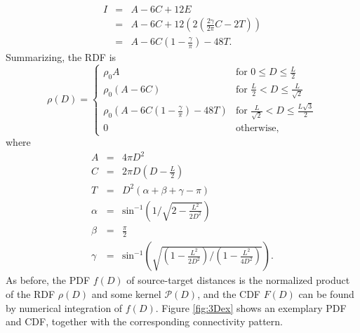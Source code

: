 \begin{eqnarray}
I &=& A - 6C + 12E \\
  &=& A - 6C + 12\left( 2\left( \tfrac{2\gamma}{2\pi}C - 2T \right) \right) \\
  &=& A - 6C\left( 1 - \tfrac{\gamma}{\pi} \right) - 48T.
\end{eqnarray}
Summarizing, the RDF is
\begin{equation}
\rho(D) = 
\begin{cases}
   \rho_0 A   &   \text{for } 0 \le D \le \frac{L}{2} \\ 
   \rho_0 \left(A - 6C\right)   &   \text{for } \frac{L}{2} < D \le \frac{L}{\sqrt{2}} \\
   \rho_0 \left(A - 6C\left( 1 - \tfrac{\gamma}{\pi} \right) - 48T \right)   &   \text{for } \frac{L}{\sqrt{2}} < D \le \frac{L\sqrt{3}}{2} \\
   0 & \text{otherwise},
\end{cases}
\end{equation}
where
\begin{eqnarray}
A &=& 4\pi D^2 \\
C &=& 2\pi D \left(D-\tfrac{L}{2}\right) \\
T &=& D^2\left( \alpha+\beta+\gamma-\pi \right) \\
\alpha &=& \text{sin}^{-1}\left( 1 / \sqrt{2 - \tfrac{L^2}{2D^2}} \right) \\
\beta  &=& \tfrac{\pi}{2} \\
\gamma &=& \text{sin}^{-1}\left(  \sqrt{(1 - \tfrac{L^2}{2D^2}) / (1 - \tfrac{L^2}{4D^2})}  \right) .
\end{eqnarray}
As before, the PDF $f(D)$ of source-target distances is the normalized product of the RDF $\rho(D)$ and some kernel $\mathcal{P}(D)$, and the CDF $F(D)$ can be found by numerical integration of $f(D)$. Figure \ref{fig:3Dex} shows an exemplary PDF and CDF, together with the corresponding connectivity pattern. 

